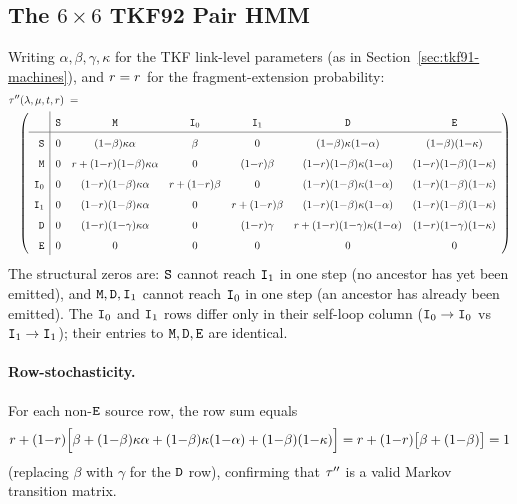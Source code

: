 \subsection{The \texorpdfstring{$6{\times}6$}{6x6} TKF92 Pair HMM}
\label{sec:wfst92-pair-hmm}

Writing $\alpha,\beta,\gamma,\kappa$ for the TKF link-level parameters
(as in Section~\ref{sec:tkf91-machines}), and $r=r$
for the fragment-extension probability:
\begin{eqnarray}
\lefteqn{\tkftrans''(\insrate,\delrate,\evoltime,\ext) \;= \quad} \label{eq:tkf92-pair-hmm-6x6} \\
& & \renewcommand{\arraystretch}{1.6}
\left(
\begin{array}{r|cccccc}
& \sta & \mat & \ins_0 & \ins_1 & \del & \fin \\\hline
\sta   & 0 & (1{-}\beta)\kappa\alpha
            & \beta
            & 0
            & (1{-}\beta)\kappa(1{-}\alpha)
            & (1{-}\beta)(1{-}\kappa) \\
\mat   & 0 & r + (1{-}r)(1{-}\beta)\kappa\alpha
            & 0
            & (1{-}r)\beta
            & (1{-}r)(1{-}\beta)\kappa(1{-}\alpha)
            & (1{-}r)(1{-}\beta)(1{-}\kappa) \\
\ins_0 & 0 & (1{-}r)(1{-}\beta)\kappa\alpha
            & r + (1{-}r)\beta
            & 0
            & (1{-}r)(1{-}\beta)\kappa(1{-}\alpha)
            & (1{-}r)(1{-}\beta)(1{-}\kappa) \\
\ins_1 & 0 & (1{-}r)(1{-}\beta)\kappa\alpha
            & 0
            & r + (1{-}r)\beta
            & (1{-}r)(1{-}\beta)\kappa(1{-}\alpha)
            & (1{-}r)(1{-}\beta)(1{-}\kappa) \\
\del   & 0 & (1{-}r)(1{-}\gamma)\kappa\alpha
            & 0
            & (1{-}r)\gamma
            & r + (1{-}r)(1{-}\gamma)\kappa(1{-}\alpha)
            & (1{-}r)(1{-}\gamma)(1{-}\kappa) \\
\fin   & 0 & 0 & 0 & 0 & 0 & 0
\end{array}
\right) \nonumber
\end{eqnarray}
The structural zeros are: ${\tt S}$ cannot reach ${\tt I}_1$ in one step
(no ancestor has yet been emitted), and ${\tt M},{\tt D},{\tt I}_1$ cannot
reach ${\tt I}_0$ in one step (an ancestor has already been emitted).
The ${\tt I}_0$ and ${\tt I}_1$ rows differ only in their self-loop column
(${\tt I}_0\to{\tt I}_0$ vs ${\tt I}_1\to{\tt I}_1$); their entries to ${\tt M},{\tt D},
{\tt E}$ are identical.

\paragraph{Row-stochasticity.}
For each non-${\tt E}$ source row, the row sum equals
\[
r + (1{-}r)\Bigl[\beta + (1{-}\beta)\kappa\alpha + (1{-}\beta)\kappa(1{-}\alpha)
                  + (1{-}\beta)(1{-}\kappa)\Bigr]
= r + (1{-}r)\bigl[\beta + (1{-}\beta)\bigr] = 1
\]
(replacing $\beta$ with $\gamma$ for the ${\tt D}$ row), confirming that
$\tau''$ is a valid Markov transition matrix.

